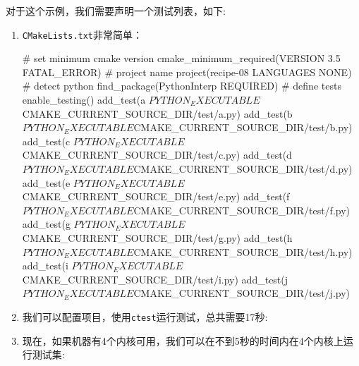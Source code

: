 对于这个示例，我们需要声明一个测试列表，如下:

\begin{enumerate}
\item \texttt{CMakeLists.txt}非常简单：

\begin{codebox}[cmake]
# set minimum cmake version
cmake_minimum_required(VERSION 3.5 FATAL_ERROR)
# project name
project(recipe-08 LANGUAGES NONE)
# detect python
find_package(PythonInterp REQUIRED)
# define tests
enable_testing()
add_test(a ${PYTHON_EXECUTABLE} ${CMAKE_CURRENT_SOURCE_DIR}/test/a.py)
add_test(b ${PYTHON_EXECUTABLE} ${CMAKE_CURRENT_SOURCE_DIR}/test/b.py)
add_test(c ${PYTHON_EXECUTABLE} ${CMAKE_CURRENT_SOURCE_DIR}/test/c.py)
add_test(d ${PYTHON_EXECUTABLE} ${CMAKE_CURRENT_SOURCE_DIR}/test/d.py)
add_test(e ${PYTHON_EXECUTABLE} ${CMAKE_CURRENT_SOURCE_DIR}/test/e.py)
add_test(f ${PYTHON_EXECUTABLE} ${CMAKE_CURRENT_SOURCE_DIR}/test/f.py)
add_test(g ${PYTHON_EXECUTABLE} ${CMAKE_CURRENT_SOURCE_DIR}/test/g.py)
add_test(h ${PYTHON_EXECUTABLE} ${CMAKE_CURRENT_SOURCE_DIR}/test/h.py)
add_test(i ${PYTHON_EXECUTABLE} ${CMAKE_CURRENT_SOURCE_DIR}/test/i.py)
add_test(j ${PYTHON_EXECUTABLE} ${CMAKE_CURRENT_SOURCE_DIR}/test/j.py)
\end{codebox}

\item 我们可以配置项目，使用\texttt{ctest}运行测试，总共需要17秒:


\item 现在，如果机器有4个内核可用，我们可以在不到5秒的时间内在4个内核上运行测试集:


\end{enumerate}
